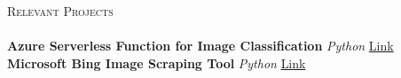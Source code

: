 \documentclass[a4paper]{article}
\newcommand{\lineunder} {
    \vspace*{-8pt} \\
    \hspace*{-18pt} \hrulefill \\
}
\newcommand{\header} [1] {
    {\hspace*{-18pt}\vspace*{6pt} \textsc{#1}}
    \vspace*{-6pt} \lineunder
}
\begin{document}
\header{Relevant Projects}
{\textbf{Azure Serverless Function for Image Classification}} {\sl Python} \hfill \href{https://github.com/rohanfaiyazkhan/azure-function-image-classifier}{Link} \\
\vspace*{2mm}
{\textbf{Microsoft Bing Image Scraping Tool}} {\sl Python} \hfill \href{https://github.com/rohanfaiyazkhan/bing-search-image-scraping}{Link} \\
\end{document}
